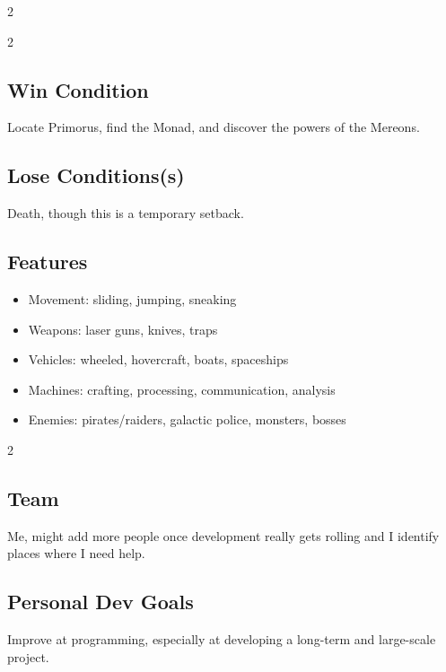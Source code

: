 \documentclass[10pt,a4paper]{article}
\begin{document}
\begin{multicols*}{2}
\begin{multicols}{2}
    \subsection{Win Condition}
      Locate Primorus, find the Monad, and discover the powers of the Mereons.
    \subsection{Lose Conditions(s)}
      Death, though this is a temporary setback.
  \end{multicols}
  \subsection{Features}
\begin{itemize}
  \item Movement: sliding, jumping, sneaking
  \item Weapons: laser guns, knives, traps
  \item Vehicles: wheeled, hovercraft, boats, spaceships
  \item Machines: crafting, processing, communication, analysis
  \item Enemies: pirates/raiders, galactic police, monsters, bosses
\end{itemize}
\begin{multicols}{2}
  \subsection{Team}
  Me, might add more people once development really gets rolling and I identify places where I need help.
  \columnbreak
  \subsection{Personal Dev Goals}
  Improve at programming, especially at developing a long-term and large-scale project.
  
\end{multicols}

\end{multicols*}
\end{document}
